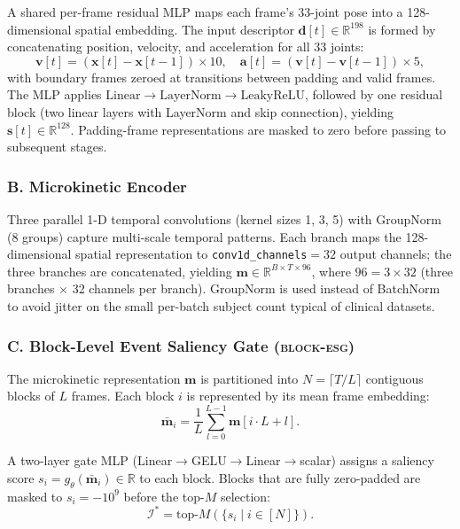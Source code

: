 \documentclass[a4paper,fleqn]{cas-sc}
\newcommand{\besg}{\textsc{block-esg}\xspace}
\begin{document}
A shared per-frame residual MLP maps each frame's 33-joint pose into a
128-dimensional spatial embedding.
The input descriptor $\mathbf{d}[t] \in \mathbb{R}^{198}$ is formed by
concatenating position, velocity, and acceleration for all 33 joints:
\begin{equation}
  \mathbf{v}[t] = (\mathbf{x}[t] - \mathbf{x}[t{-}1]) \times 10, \quad
  \mathbf{a}[t] = (\mathbf{v}[t] - \mathbf{v}[t{-}1]) \times 5,
  \label{eq:kinematics}
\end{equation}
with boundary frames zeroed at transitions between padding and valid frames.
The MLP applies $\text{Linear} \to \text{LayerNorm} \to \text{LeakyReLU}$,
followed by one residual block (two linear layers with LayerNorm and skip
connection), yielding $\mathbf{s}[t] \in \mathbb{R}^{128}$.
Padding-frame representations are masked to zero before passing to subsequent
stages.

\subsubsection{B. Microkinetic Encoder}

Three parallel 1-D temporal convolutions (kernel sizes 1, 3, 5) with
GroupNorm (8 groups) capture multi-scale temporal patterns.
Each branch maps the 128-dimensional spatial representation to
\texttt{conv1d\_channels}$=32$ output channels; the three branches
are concatenated, yielding $\mathbf{m} \in \mathbb{R}^{B \times T \times 96}$,
where $96 = 3 \times 32$ (three branches $\times$ 32 channels per branch).
GroupNorm is used instead of BatchNorm to avoid jitter on the small per-batch
subject count typical of clinical datasets.

\subsubsection{C. Block-Level Event Saliency Gate (\besg)}
\label{sec:method_esg}

The microkinetic representation $\mathbf{m}$ is partitioned into
$N = \lceil T / L \rceil$ contiguous blocks of $L$ frames.
Each block $i$ is represented by its mean frame embedding:
\begin{equation}
  \bar{\mathbf{m}}_i = \frac{1}{L}\sum_{l=0}^{L-1}\mathbf{m}[i\cdot L + l].
  \label{eq:block_mean}
\end{equation}

A two-layer gate MLP (Linear$\to$GELU$\to$Linear$\to$scalar) assigns a
saliency score $s_i = g_\theta(\bar{\mathbf{m}}_i) \in \mathbb{R}$ to each block.
Blocks that are fully zero-padded are masked to $s_i = -10^9$ before the
top-$M$ selection:
\begin{equation}
  \mathcal{I}^* = \text{top-}M(\{s_i \mid i \in [N]\}).
  \label{eq:topk}
\end{equation}
\end{document}
